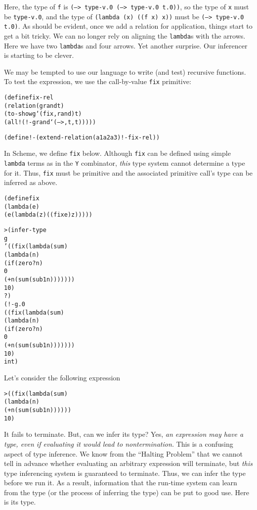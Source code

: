 Here, the type of \texttt{f} is \texttt{(--> type-v.0 (--> type-v.0 t.0))}, so
the type of \texttt{x} must be \texttt{type-v.0}, and the type of
\texttt{(lambda (x) ((f x) x))} must be \texttt{(--> type-v.0 t.0)}.
As should be evident, once we add a relation for application, things
start to get a bit tricky.  We can no longer rely on aligning the
\texttt{lambda}s with the arrows.  Here we have two \texttt{lambda}s
and four arrows.  Yet another surprise.  Our inferencer is starting
to be clever.

We may be tempted to use our language to write (and test) recursive
functions.  To test the expression, we use the call-by-value \texttt{fix}
primitive:

\begin{alltt}
(define fix-rel
  (relation (g rand t)
    (to-show g `(fix ,rand) t)
    (all! (!- g rand `(--> ,t ,t)))))

(define !- (extend-relation (a1 a2 a3) !- fix-rel))
\end{alltt}

In Scheme, we define \texttt{fix} below.  Although \texttt{fix} can
be defined using simple \texttt{lambda} terms as in the \texttt{Y}
combinator, \emph{this} type system cannot determine a type for it.
Thus, \texttt{fix} must be primitive and the associated primitive
call's type can be inferred as above.

\begin{alltt}
(define fix
  (lambda (e)
    (e (lambda (z) ((fix e) z)))))
\end{alltt}

\begin{alltt}
> (infer-type
    g
    '((fix (lambda (sum)
             (lambda (n)
               (if (zero? n)
                 0
                 (+ n (sum (sub1 n)))))))
      10)
    ?)
(!- g.0
    ((fix (lambda (sum)
            (lambda (n)
              (if (zero? n)
                 0
                 (+ n (sum (sub1 n)))))))
     10)
    int)
\end{alltt}

Let's consider the following expression
\begin{alltt}
> ((fix (lambda (sum)
          (lambda (n)
            (+ n (sum (sub1 n))))))
   10)
\end{alltt}

It fails to terminate.  But, can we infer its type?  Yes, \emph{an
expression may have a type, even if evaluating it would lead to
nontermination.}  This is a confusing aspect of type inference.  We
know from the ``Halting Problem'' that we cannot tell in advance
whether evaluating an arbitrary expression will terminate, but
\emph{this} type inferencing system is guaranteed to terminate.  Thus,
we can infer the type before we run it.  As a result, information that
the run-time system can learn from the type (or the process of
inferring the type) can be put to good use.  Here is its type.

